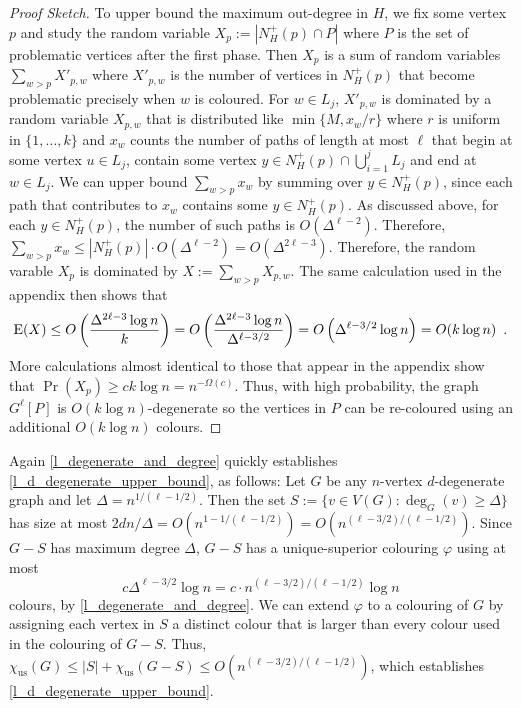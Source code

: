 \documentclass{patmorin}
\newcommand{\trn}{\chi_{\mathrm{us}}}
\begin{document}
\begin{proof}[Proof Sketch]
  To upper bound the maximum out-degree in $H$, we fix some vertex $p$ and study the random variable $X_p:=|N^+_H(p)\cap P|$ where $P$ is the set of problematic vertices after the first phase.  Then $X_p$ is a sum of random variables $\sum_{w>p} X'_{p,w}$ where $X'_{p,w}$ is the number of vertices in $N^+_H(p)$ that become problematic precisely when $w$ is coloured.  For $w\in L_j$, $X'_{p,w}$ is dominated by a random variable $X_{p,w}$ that is distributed like $\min\{M,x_w/r\}$ where $r$ is uniform in $\{1,\ldots,k\}$ and $x_w$ counts the number of paths of length at most $\ell$ that begin at some vertex $u\in L_j$, contain some vertex $y\in N^+_H(p)\cap \bigcup_{i=1}^j L_j$ and end at $w\in L_j$.
  We can upper bound $\sum_{w>p} x_w$ by summing over $y\in N^+_H(p)$, since each path that contributes to $x_w$ contains some $y\in N_H^+(p)$.  As discussed above, for each $y\in N^+_H(p)$, the number of such paths is $O(\Delta^{\ell-2})$.
  Therefore, $\sum_{w>p} x_w\le |N^+_H(p)|\cdot O(\Delta^{\ell-2})=O(\Delta^{2\ell-3})$.  Therefore, the random varable $X_p$ is dominated by $X:=\sum_{w>p} X_{p,w}$. The same calculation used in the appendix then shows that
  \[
    \mathrm{E}(X) \le O\left(\frac{\Delta^{2\ell-3}\log n}{k}\right)
    = O\left(\frac{\Delta^{2\ell-3}\log n}{\Delta^{\ell-3/2}}\right)
    =  O\left(\Delta^{\ell-3/2}\log n\right)=O(k\log n) \enspace .
  \]
  More calculations almost identical to those that appear in the appendix show that $\Pr(X_p)\ge ck\log n=n^{-\Omega(c)}$.  Thus, with high probability, the graph $G^{\ell}[P]$ is $O(k\log n)$-degenerate so the vertices in $P$ can be re-coloured using an additional $O(k\log n)$ colours.
\end{proof}

Again \cref{l_degenerate_and_degree} quickly establishes \cref{l_d_degenerate_upper_bound}, as follows:  Let $G$ be any $n$-vertex $d$-degenerate graph and let $\Delta=n^{1/(\ell-1/2)}$.  Then the set $S:=\{v\in V(G):\deg_G(v)\ge \Delta\}$ has size at most $2dn/\Delta=O(n^{1-1/(\ell-1/2)})=O(n^{(\ell-3/2)/(\ell-1/2)})$.  Since $G-S$ has maximum degree $\Delta$, $G-S$ has a unique-superior colouring $\varphi$ using at most
\[
  c\Delta^{\ell-3/2}\log n
  = c\cdot n^{(\ell-3/2)/(\ell-1/2)}\log n
\]
 colours, by \cref{l_degenerate_and_degree}. We can extend $\varphi$ to a colouring of $G$ by assigning each vertex in $S$ a distinct colour that is larger than every colour used in the colouring of $G-S$.  Thus, $\trn(G)\le |S|+\trn(G-S)\le O(n^{(\ell-3/2)/(\ell-1/2)})$, which establishes \cref{l_d_degenerate_upper_bound}.
\end{document}
